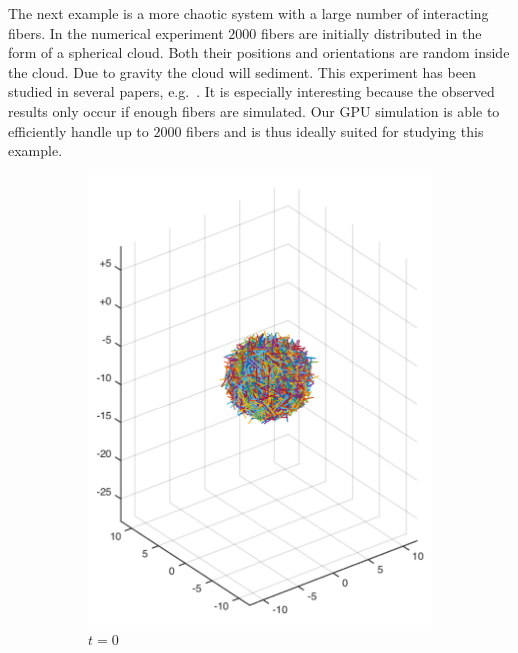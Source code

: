 The next example is a more chaotic system with a large number of interacting fibers. In the numerical experiment $2000$ fibers are initially distributed in the form of a spherical cloud. Both their positions and orientations are random inside the cloud. Due to gravity the cloud will sediment. This experiment has been studied in several papers, e.g.~\cite{Bulow2015}\cite{Metzger2007}\cite{Park2010}. It is especially interesting because the observed results only occur if enough fibers are simulated. Our GPU simulation is able to efficiently handle up to $2000$ fibers and is thus ideally suited for studying this example.

\begin{figure}[htbp]
  \centering
  \begin{subfigure}[h]{0.45\textwidth}
    \centering
    \includegraphics[width=\textwidth]{img/state_00000.pdf}
    \caption{$t=0$}\label{fig:sphere_simulation_1a}
  \end{subfigure}
  \begin{subfigure}[h]{0.45\textwidth}

\end{subfigure}
\end{figure}
